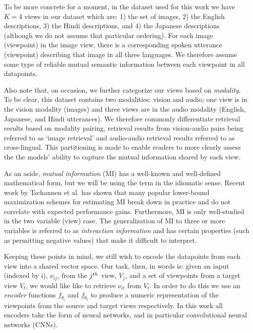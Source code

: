 To be more concrete for a moment, in the dataset used for this work we have $K=4$ views in our dataset which are: 1) the set of images, 2) the English descriptions, 3) the Hindi descriptions, and 4) the Japanese descriptions (although we do not assume that particular ordering).
For each image (viewpoint) in the image view, there is a corresponding spoken utterance (viewpoint) describing that image in all three languages.
We therefore assume some type of reliable mutual semantic information between each viewpoint in all datapoints.

Also note that, on occasion, we further categorize our views based on \textit{modality}.
To be clear, this dataset contains two modalities: vision and audio; one view is in the vision modality (images) and three views are in the audio modality (English, Japanese, and Hindi utterances).
We therefore commonly differentiate retrieval results based on modality pairing, retrieval results from vision-audio pairs being referred to as `image retrieval' and audio-audio retrieval results referred to as cross-lingual.
This partitioning is made to enable readers to more clearly assess the the models' ability to capture the mutual information shared by each view.


As an aside, \textit{mutual information} (MI) has a well-known and well-defined mathematical form, but we will be using the term in the idiomatic sense.
Recent work by Tschannen et al. \cite{tschannen2019mutual} has shown that  many popular lower-bound maximization schemes for estimating MI break down in practice and do not correlate with expected performance gains.
Furthermore, MI is only well-studied in the two variable (view) case. 
The generalization of MI to three or more variables is referred to as \textit{interaction information} and has certain properties (such as permitting negative values) that make it difficult to interpret.


Keeping these points in mind, we still wish to encode the datapoints from each view into a shared vector space. 
Our task, then, in words is: given an input (indexed by i), $\nu_{ij}$, from the $j^{th}$ view, $V_j$, and a set of viewpoints from a target view $V_t$, we would like like to retrieve $\nu_{it}$ from $V_t$.
In order to do this we use an \textit{encoder} functions $f_{\theta_i}$ and $f_{\theta_t}$ to produce a numeric representation of the viewpoints from the source and target views respectively.
In this work all encoders take the form of neural networks, and in particular convolutional neural networks (CNNs).

